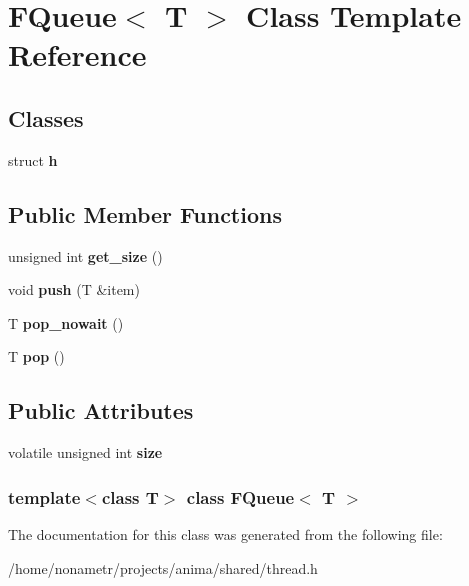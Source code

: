 \hypertarget{classFQueue}{
\section{FQueue$<$ T $>$ Class Template Reference}
\label{classFQueue}
}
\subsection*{Classes}
\begin{DoxyCompactItemize}
\item 
struct {\bfseries h}
\end{DoxyCompactItemize}
\subsection*{Public Member Functions}
\begin{DoxyCompactItemize}
\item 
\hypertarget{classFQueue_a4b35a56d5f8fe8f397e28199a5a8982b}{
unsigned int {\bfseries get\_\-size} ()}
\label{classFQueue_a4b35a56d5f8fe8f397e28199a5a8982b}

\item 
\hypertarget{classFQueue_ade42b2fc46190e8c495146a5ccf8a7db}{
void {\bfseries push} (T \&item)}
\label{classFQueue_ade42b2fc46190e8c495146a5ccf8a7db}

\item 
\hypertarget{classFQueue_afffb1b8c16c376dbd3e07176dcd9db8f}{
T {\bfseries pop\_\-nowait} ()}
\label{classFQueue_afffb1b8c16c376dbd3e07176dcd9db8f}

\item 
\hypertarget{classFQueue_af092abd2f72dcd439fae8884c582cd5a}{
T {\bfseries pop} ()}
\label{classFQueue_af092abd2f72dcd439fae8884c582cd5a}

\end{DoxyCompactItemize}
\subsection*{Public Attributes}
\begin{DoxyCompactItemize}
\item 
\hypertarget{classFQueue_aab9b36ae990932f15d2de208a37c35b6}{
volatile unsigned int {\bfseries size}}
\label{classFQueue_aab9b36ae990932f15d2de208a37c35b6}

\end{DoxyCompactItemize}
\subsubsection*{template$<$class T$>$ class FQueue$<$ T $>$}



The documentation for this class was generated from the following file:\begin{DoxyCompactItemize}
\item 
/home/nonametr/projects/anima/shared/thread.h\end{DoxyCompactItemize}
